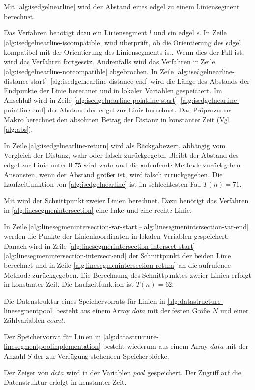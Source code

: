 Mit \autoref{alg:isedgelnearline} wird der Abstand eines \gls{edgel} zu einem Liniensegment berechnet.

Das Verfahren benötigt dazu ein Liniensegment $l$ und ein \gls{edgel} $e$. In Zeile
 \ref{alg:isedgelnearline-iscompatible} wird überprüft, ob die Orientierung des \gls{edgel} kompatibel mit der
 Orientierung des Liniensegments ist. Wenn dies der Fall ist, wird das Verfahren fortgesetz. Andrenfalls wird das
 Verfahren in Zeile \ref{alg:isedgelnearline-notcompatible} abgebrochen. In Zeile
 \ref{alg:isedgelnearline-distance-start}--\ref{alg:isedgelnearline-distance-end} wird die Länge des Abstands der
 Endpunkte der Linie berechnet und in lokalen Variablen gespeichert. Im Anschluß wird in Zeile
 \ref{alg:isedgelnearline-pointline-start}--\ref{alg:isedgelnearline-pointline-end} der Abstand des \gls{edgel} zur
 Linie berechnet. Das Präprozessor Makro  berechnet den absoluten Betrag der Distanz in konstanter Zeit
 (Vgl. \autoref{alg:abs}).

In Zeile \ref{alg:isedgelnearline-return} wird als Rückgabewert, abhängig vom Vergleich der Distanz, wahr oder falsch
 zurückgegebn. Bleibt der Abstand des \gls{edgel} zur Linie unter $0.75$ wird wahr and die aufrufende Methode
 zurückgeben. Ansonsten, wenn der Abstand größer ist, wird falsch zurückgegeben. Die Laufzeitfunktion von
 \autoref{alg:isedgelnearline} ist im schlechtesten Fall $T(n) = 71$.

Mit  wird der Schnittpunkt zweier Linien berechnet. Dazu benötigt das Verfahren in
 \autoref{alg:linesegmenintersection} eine linke und eine rechte Linie.

 In Zeile \ref{alg:linesegmenintersection-var-start}--\ref{alg:linesegmenintersection-var-end} werden die Punkte der
 Linienkoordinaten in lokalen Variablen gespeichert. Danach wird in Zeile
 \ref{alg:linesegmenintersection-intersect-start}--\ref{alg:linesegmenintersection-intersect-end} der Schnittpunkt der
 beiden Linie berechnet und in Zeile \ref{alg:linesegmenintersection-return} an die aufrufende Methode zurückgegeben.
 Die Berechnung des Schnittpunktes zweier Linien erfolgt in konstanter Zeit. Die Laufzeitfunktion ist $T(n) = 62$.

Die Datenstruktur eines Speichervorrats für Linien in \autoref{alg:datastructure-linesegmentpool} besteht aus einem
 Array $\mathit{data}$ mit der festen Größe $N$ und einer Zählvariablen $\mathit{count}$.

Der Speichervorrat für Linien in \autoref{alg:datastructure-linesegmentpoolimplementation} besteht wiederum aus einem
 Array $\mathit{data}$ mit der Anzahl $S$ der zur Verfügung stehenden Speicherblöcke.

Der Zeiger von $\mathit{data}$ wird in der Variablen $\mathit{pool}$ gespeichert. Der Zugriff auf die Datenstruktur
 erfolgt in konstanter Zeit.

